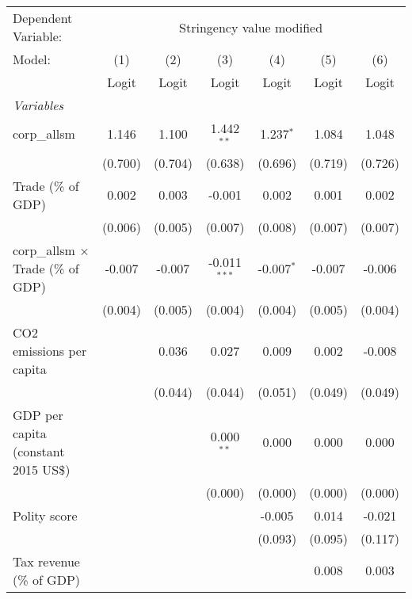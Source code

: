 
\begingroup
\centering
\begin{tabular}{lcccccc}
   \toprule
   Dependent Variable: & \multicolumn{6}{c}{Stringency value modified}\\
   Model:                                    & (1)     & (2)     & (3)            & (4)          & (5)     & (6)\\  
                                             &  Logit  & Logit   & Logit          & Logit        & Logit   & Logit\\  
   \midrule
   \emph{Variables}\\
   corp\_allsm                               & 1.146   & 1.100   & 1.442$^{**}$   & 1.237$^{*}$  & 1.084   & 1.048\\   
                                             & (0.700) & (0.704) & (0.638)        & (0.696)      & (0.719) & (0.726)\\   
   Trade (\% of GDP)                         & 0.002   & 0.003   & -0.001         & 0.002        & 0.001   & 0.002\\   
                                             & (0.006) & (0.005) & (0.007)        & (0.008)      & (0.007) & (0.007)\\   
   corp\_allsm $\times$ Trade (\% of GDP)    & -0.007  & -0.007  & -0.011$^{***}$ & -0.007$^{*}$ & -0.007  & -0.006\\   
                                             & (0.004) & (0.005) & (0.004)        & (0.004)      & (0.005) & (0.004)\\   
   CO2 emissions per capita                  &         & 0.036   & 0.027          & 0.009        & 0.002   & -0.008\\   
                                             &         & (0.044) & (0.044)        & (0.051)      & (0.049) & (0.049)\\   
   GDP per capita (constant 2015 US\$)       &         &         & 0.000$^{**}$   & 0.000        & 0.000   & 0.000\\   
                                             &         &         & (0.000)        & (0.000)      & (0.000) & (0.000)\\   
   Polity score                              &         &         &                & -0.005       & 0.014   & -0.021\\   
                                             &         &         &                & (0.093)      & (0.095) & (0.117)\\   
   Tax revenue (\% of GDP)                   &         &         &                &              & 0.008   & 0.003\\   

\end{tabular}
